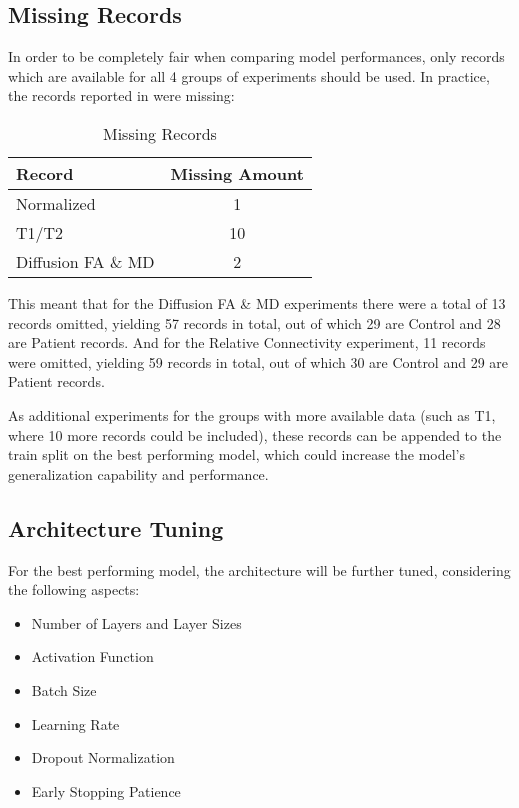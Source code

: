 \subsection{Missing Records}

In order to be completely fair when comparing model performances, only records which are available for all 4 groups of experiments should be used. In practice, the records reported in  were missing:
\begin{table}[H]
\centering
\begin{tabular}{|l|c|}
\hline
\textbf{Record} & \textbf{Missing Amount} \\ \hline
Normalized & 1 \\ \hline
T1/T2 & 10 \\ \hline
Diffusion \ac{FA} \& \ac{MD} & 2 \\ \hline
\end{tabular}
\caption{Missing Records}
\label{tab:misrec}
\end{table}
This meant that for the Diffusion \ac{FA} \& \ac{MD} experiments there were a total of 13 records omitted, yielding 57 records in total, out of which 29 are Control and 28 are Patient records. And for the Relative Connectivity experiment, 11 records were omitted, yielding 59 records in total, out of which 30 are Control and 29 are Patient records.\par
As additional experiments for the groups with more available data (such as T1, where 10 more records could be included), these records can be appended to the train split on the best performing model, which could increase the model's generalization capability and performance.

\subsection{Architecture Tuning}

For the best performing model, the architecture will be further tuned, considering the following aspects:
\begin{itemize}
  \item Number of Layers and Layer Sizes
  \item Activation Function
  \item Batch Size
  \item Learning Rate
  \item Dropout Normalization
  \item Early Stopping Patience
\end{itemize}

